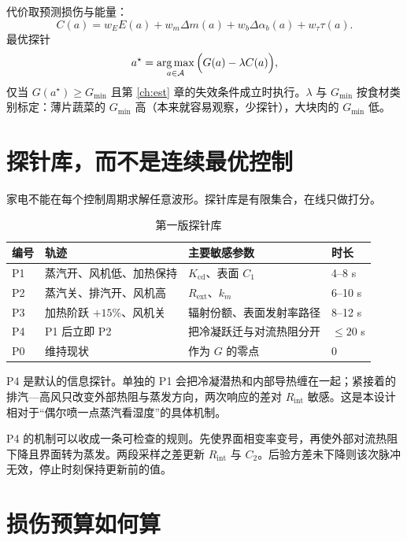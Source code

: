 代价取预测损伤与能量：
\begin{equation}
\label{eq:cost}
C(a)=w_E E(a)+w_m\Delta m(a)+w_b\Delta\alpha_b(a)+w_\tau\tau(a).
\end{equation}
最优探针
\begin{equation}
\label{eq:astar}
a^\star=\operatorname*{arg\,max}_{a\in\mathcal{A}}\Big(G(a)-\lambda C(a)\Big),
\end{equation}
仅当 $G(a^\star)\ge G_{\min}$ 且第 \ref{ch:est} 章的失效条件成立时执行。$\lambda$ 与 $G_{\min}$ 按食材类别标定：薄片蔬菜的 $G_{\min}$ 高（本来就容易观察，少探针），大块肉的 $G_{\min}$ 低。

\section{探针库，而不是连续最优控制}

家电不能在每个控制周期求解任意波形。探针库是有限集合，在线只做打分。

\begin{table}[H]
\centering
\caption{第一版探针库}
\begin{tabularx}{\textwidth}{lXll}
\toprule
编号 & 轨迹 & 主要敏感参数 & 时长 \\
\midrule
P1 & 蒸汽开、风机低、加热保持 & $K_{\mathrm{cd}}$、表面 $C_1$ & 4--8 s \\
P2 & 蒸汽关、排汽开、风机高 & $R_{\mathrm{ext}}$、$k_m$ & 6--10 s \\
P3 & 加热阶跃 $+15\%$、风机关 & 辐射份额、表面发射率路径 & 8--12 s \\
P4 & P1 后立即 P2 & 把冷凝跃迁与对流热阻分开 & $\le 20$ s \\
P0 & 维持现状 & 作为 $G$ 的零点 & 0 \\
\bottomrule
\end{tabularx}
\end{table}

P4 是默认的信息探针。单独的 P1 会把冷凝潜热和内部导热缠在一起；紧接着的排汽—高风只改变外部热阻与蒸发方向，两次响应的差对 $R_{\mathrm{int}}$ 敏感。这是本设计相对于“偶尔喷一点蒸汽看湿度”的具体机制。

P4 的机制可以收成一条可检查的规则。先使界面相变率变号，再使外部对流热阻下降且界面转为蒸发。两段采样之差更新 $R_{\mathrm{int}}$ 与 $C_2$。后验方差未下降则该次脉冲无效，停止时刻保持更新前的值。

\section{损伤预算如何算}

